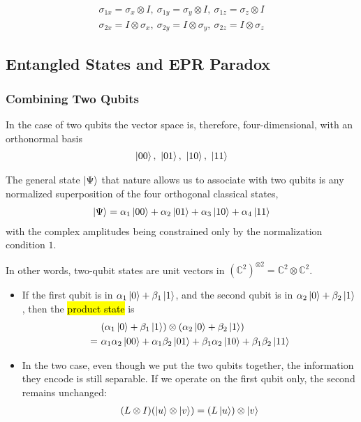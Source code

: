 \begin{align*}
    \sigma_{1x}=\sigma_x \otimes I, \ \sigma_{1y}=\sigma_y \otimes I,\ \sigma_{1z}=\sigma_z \otimes I\\
    \sigma_{2x}=I \otimes \sigma_x, \ \sigma_{2y}=I \otimes \sigma_y,\ \sigma_{2z}=I \otimes \sigma_z
\end{align*}

\subsection{Entangled States and EPR Paradox}

\subsubsection{Combining Two Qubits}
In the case of two qubits the vector space is, therefore, four-dimensional, with an orthonormal basis
\begin{align*}
    \ket{00},\ \ket{01},\ \ket{10},\ \ket{11}
\end{align*}

The general state $\ket{\Psi}$ that nature allows us to associate with two qubits is any normalized superposition of the four orthogonal classical states,
\begin{align*}
    \ket{\Psi}=\alpha_1\ket{00}+\alpha_2\ket{01}+\alpha_3\ket{10}+\alpha_4\ket{11}
\end{align*}
with the complex amplitudes being constrained only by the normalization condition $1$. 

In other words, two-qubit states are unit vectors in $\left(\mathbb{C}^2\right)^{\otimes 2}=\mathbb{C}^2\otimes \mathbb{C}^2$. 
\begin{itemize}
    \item If the first qubit is in $\alpha_1\ket{0}+\beta_1\ket{1}$, and the second qubit is in $\alpha_2\ket{0}+\beta_2\ket{1}$, then the \hl{product state} is
    \begin{align*}
        &(\alpha_1\ket{0}+\beta_1\ket{1}) \otimes (\alpha_2\ket{0}+\beta_2\ket{1})\\
        =\ &\alpha_1\alpha_2\ket{00}+\alpha_1\beta_2\ket{01}+\beta_1\alpha_2\ket{10}+\beta_1\beta_2\ket{11}
    \end{align*}
    \item In the two case, even though we put the two qubits together, the information they encode is still separable. If we operate on the first qubit only, the second remains unchanged:
    \begin{align*}
        (L\otimes I)(\ket{u} \otimes \ket{v})=(L\ket{u})\otimes \ket{v}
    \end{align*}
\end{itemize}

